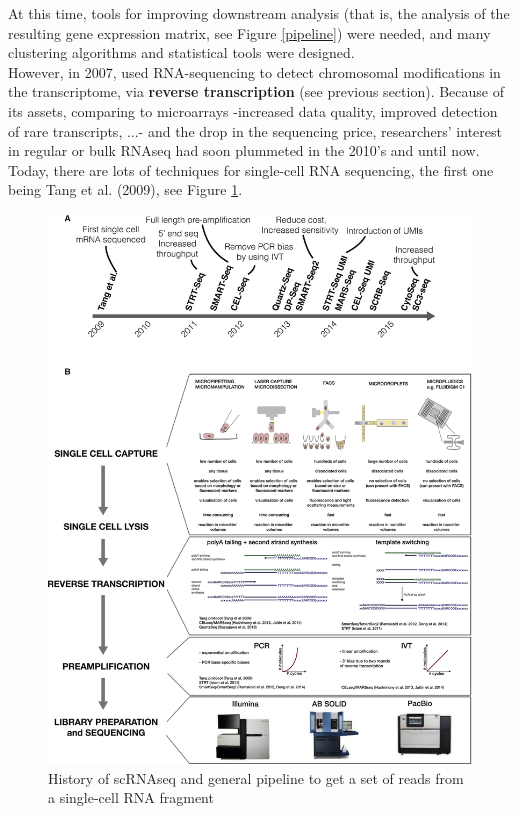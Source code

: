 \documentclass{report}
\begin{document}
At this time, tools for improving downstream analysis (that is, the analysis of the resulting gene expression matrix, see Figure \ref{pipeline}) were needed, and many clustering algorithms\cite{do2008clustering}\cite{dabney2005classification}\cite{eisen1998cluster}\cite{monti2003consensus} and statistical tools\cite{simon2007analysis}\cite{kerr2000analysis} were designed.\\

However, in 2007, \cite{barbazuk2007snp} used RNA-sequencing to detect chromosomal modifications in the transcriptome, via \textbf{reverse transcription} (see previous section). Because of its assets, comparing to microarrays -increased data quality\cite{zhao2014comparison}\cite{wang2009rna}, improved detection of rare transcripts, ...\cite{illuminarnamicroarray}- and the drop in the sequencing price, researchers' interest in regular or bulk RNAseq had soon plummeted in the 2010's and until now\cite{conesa2016survey}\cite{leon2015bayesian}.\\

Today, there are lots of techniques\cite{shapiro2013single} for single-cell RNA sequencing, the first one being Tang et al.\cite{tang2009mrna} (2009), see Figure \ref{historyseq}.

\begin{figure}[H]
\centering
\includegraphics[scale=1]{illustrations/scrnaseq.jpg}
\caption{History of scRNAseq and general pipeline to get a set of reads from a single-cell RNA fragment}
\label{historyseq}
\end{figure}
\end{document}
